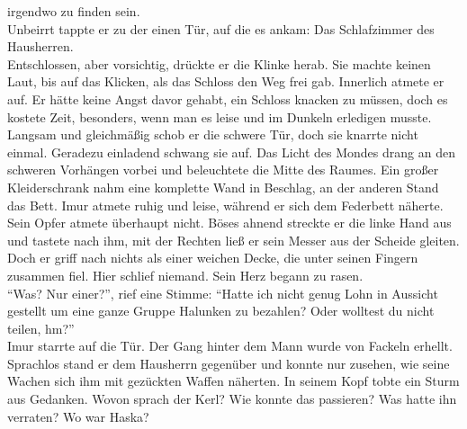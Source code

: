 irgendwo zu finden sein. \\
Unbeirrt tappte er zu der einen Tür, auf die es ankam: Das Schlafzimmer des Hausherren.\\
Entschlossen, aber vorsichtig, drückte er die Klinke herab. Sie machte keinen Laut, bis auf das 
Klicken, als das Schloss den Weg frei gab. Innerlich atmete er auf. Er hätte keine Angst davor 
gehabt, ein Schloss knacken zu müssen, doch es kostete Zeit, besonders, wenn man es leise und im 
Dunkeln erledigen musste.\\
Langsam und gleichmäßig schob er die schwere Tür, doch sie knarrte nicht einmal. Geradezu 
einladend schwang sie auf. Das Licht des Mondes drang an den schweren Vorhängen vorbei und 
beleuchtete die Mitte des Raumes. Ein großer Kleiderschrank nahm eine komplette Wand in Beschlag, 
an der anderen Stand das Bett. Imur atmete ruhig und leise, während er sich dem Federbett näherte. 
Sein Opfer atmete überhaupt nicht. Böses ahnend streckte er die linke Hand aus und tastete nach 
ihm, mit der Rechten ließ er sein Messer aus der Scheide gleiten.
Doch er griff nach nichts als einer weichen Decke, die unter seinen Fingern zusammen fiel.
Hier schlief niemand. Sein Herz begann zu rasen.\\
``Was? Nur einer?'', rief eine Stimme: ``Hatte ich nicht genug Lohn in Aussicht gestellt um eine 
ganze Gruppe Halunken zu bezahlen? Oder wolltest du nicht teilen, hm?''\\
Imur starrte auf die Tür. Der Gang hinter dem Mann wurde von Fackeln erhellt. Sprachlos stand er 
dem Hausherrn gegenüber und konnte nur zusehen, wie seine Wachen sich ihm mit gezückten 
Waffen näherten. In seinem Kopf tobte ein Sturm aus Gedanken. Wovon sprach der Kerl? Wie konnte das 
passieren? Was hatte ihn verraten? Wo war Haska?\\


